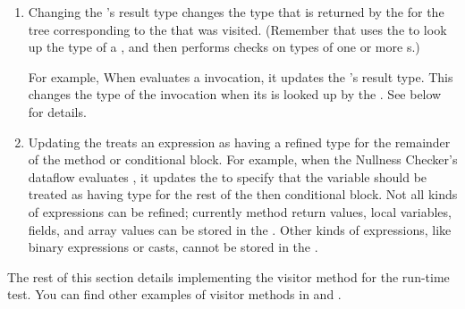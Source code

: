 \begin{enumerate}
\item
\begin{sloppypar}
Changing the 's result type changes
the type that is returned by the 
for the tree corresponding to the  that was
visited.  (Remember that  uses the
 to look up the type of a
, and then performs checks on types of one or more
s.)
\end{sloppypar}

For example, When  evaluates a
 invocation, it updates the
's result type. This changes the
type of the  invocation when its
 is looked up by the
.  See below for details.

\item
Updating the  treats an expression as
having a refined type for the remainder of the method or conditional block. For
example, when the Nullness Checker's dataflow evaluates , it
updates the  to specify that the variable
 should be treated as having type  for the rest of the
then conditional block.  Not all kinds of expressions can be refined; currently
method return values, local variables, fields, and array values can be stored in
the .  Other kinds of expressions, like
binary expressions or casts, cannot be stored in the
.

\end{enumerate}


\begin{sloppypar}
The rest of this section details implementing the visitor method
 for the 
run-time test.  You can find other examples of visitor methods in
 and
.
\end{sloppypar}



